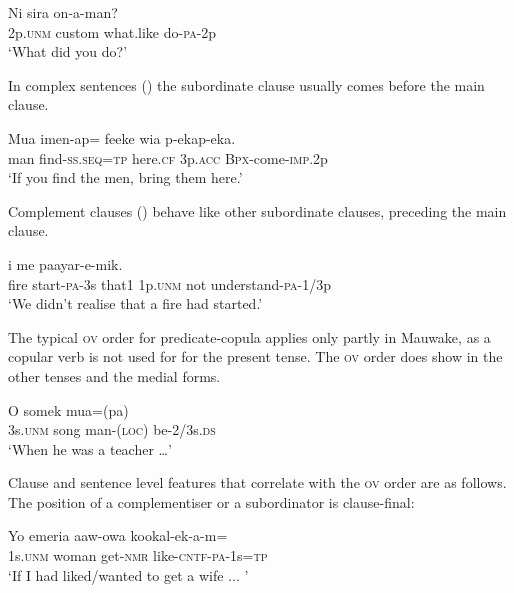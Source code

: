 \ea%
\label{ex:1:x673}
\gll Ni  sira   on-a-man? \\
2p.\textsc{unm}  custom  what.like  do-\textsc{pa}-2p      \\
\glt`What did you do?'
\z


In complex sentences () the subordinate clause usually comes before the main clause.

\ea%
\label{ex:1:x674}
\gll Mua  imen-ap=  feeke  wia  p-ekap-eka. \\
 man  find-\textsc{ss}.\textsc{seq}=\textsc{tp}  here.\textsc{cf}  3p.\textsc{acc}  \textsc{Bpx}-come-\textsc{imp}.2p     \\
\glt`If you find the men, bring them here.'
\z


Complement clauses () behave like other subordinate clauses, preceding the main clause. 

\ea%
\label{ex:1:x675}
\gll {}     i  me  paayar-e-mik. \\
fire  start-\textsc{pa}-3s  that1  1p.\textsc{unm}  not  understand-\textsc{pa}-1/3p      \\
\glt`We didn't realise that a fire had started.'
\z


The typical \textsc{ov} order for predicate-copula applies only partly in Mauwake, as a copular verb is not used for for the present tense. The \textsc{ov} order does show in the other tenses and the medial forms.

\ea%
\label{ex:1:x676}
\gll O  somek  mua=(pa)   \\
3s.\textsc{unm}  song  man-(\textsc{loc})  be-2/3s.\textsc{ds}      \\
\glt`When he was a teacher {\dots}'
\z


Clause and sentence level features that correlate with the \textsc{ov} order are as follows. The position of a complementiser or a subordinator is clause-final:

\ea%
\label{ex:1:x677}
\gll Yo  emeria  aaw-owa  kookal-ek-a-m= \\
 1s.\textsc{unm}  woman  get-\textsc{nmr}  like-\textsc{cntf}-\textsc{pa}-1s=\textsc{tp} \\
\glt`If I had liked/wanted to get a wife ...  '
\z


